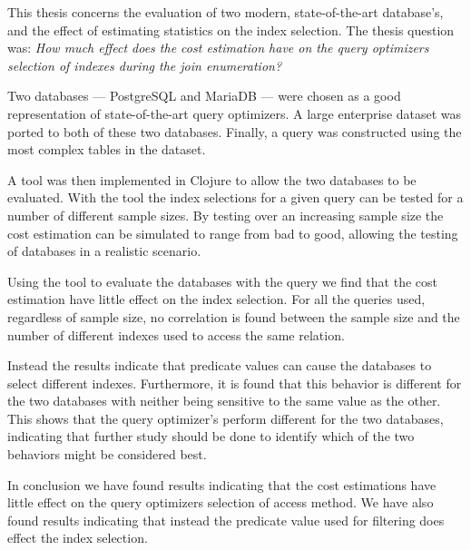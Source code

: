 This thesis concerns the evaluation of two modern, state-of-the-art database's,
and the effect of estimating statistics on the index selection. The thesis question was:
\textit{How much effect does the cost estimation have on the query optimizers selection of indexes during the join enumeration?}

Two databases --- PostgreSQL and MariaDB --- were chosen as a good representation of
state-of-the-art query optimizers. A large enterprise dataset was ported to both
of these two databases. Finally, a query was constructed using the most complex
tables in the dataset.

A tool was then implemented in Clojure to allow the two databases to be
evaluated. With the tool the index selections for a given query can be tested
for a number of different sample sizes. By testing over an increasing sample
size the cost estimation can be simulated to range from bad to good, allowing
the testing of databases in a realistic scenario.

Using the tool to evaluate the databases with the query we find that the cost
estimation have little effect on the index selection. For all the queries used,
regardless of sample size, no correlation is found between the sample size and
the number of different indexes used to access the same relation.

Instead the results indicate that predicate values can cause the databases to
select different indexes. Furthermore, it is found that this behavior is
different for the two databases with neither being sensitive to the same value
as the other. This shows that the query optimizer's perform different for the
two databases, indicating that further study should be done to identify which of
the two behaviors might be considered best.

In conclusion we have found results indicating that the cost estimations have
little effect on the query optimizers selection of access method. We have also found
results indicating that instead the predicate value used for filtering does
effect the index selection.